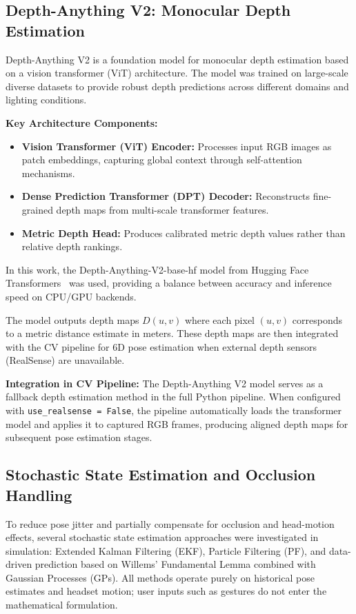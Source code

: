 \subsection{Depth-Anything V2: Monocular Depth Estimation}
\label{appendix:depthanything}

Depth-Anything V2 is a foundation model for monocular depth estimation based on a vision transformer (ViT) architecture. The model was trained on large-scale diverse datasets to provide robust depth predictions across different domains and lighting conditions.

\textbf{Key Architecture Components:}
\begin{itemize}
    \item \textbf{Vision Transformer (ViT) Encoder:} Processes input RGB images as patch embeddings, capturing global context through self-attention mechanisms.
    \item \textbf{Dense Prediction Transformer (DPT) Decoder:} Reconstructs fine-grained depth maps from multi-scale transformer features.
    \item \textbf{Metric Depth Head:} Produces calibrated metric depth values rather than relative depth rankings.
\end{itemize}

In this work, the Depth-Anything-V2-base-hf model from Hugging Face Transformers~\cite{transformers-model} was used, providing a balance between accuracy and inference speed on CPU/GPU backends.

The model outputs depth maps $D(u,v)$ where each pixel $(u,v)$ corresponds to a metric distance estimate in meters. These depth maps are then integrated with the CV pipeline for 6D pose estimation when external depth sensors (RealSense) are unavailable.

\textbf{Integration in CV Pipeline:}
The Depth-Anything V2 model serves as a fallback depth estimation method in the full Python pipeline. When configured with \texttt{use\_realsense = False}, the pipeline automatically loads the transformer model and applies it to captured RGB frames, producing aligned depth maps for subsequent pose estimation stages.

\subsection{Stochastic State Estimation and Occlusion Handling}
\label{appendix:willems}

To reduce pose jitter and partially compensate for occlusion and head-motion effects, several stochastic state estimation approaches were investigated in simulation: Extended Kalman Filtering (EKF), Particle Filtering (PF), and data-driven prediction based on Willems’ Fundamental Lemma combined with Gaussian Processes (GPs). All methods operate purely on historical pose estimates and headset motion; user inputs such as gestures do not enter the mathematical formulation.

